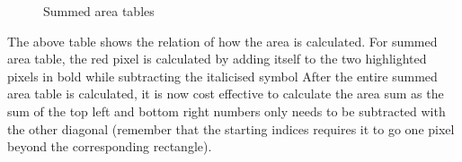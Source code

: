 \documentclass[twoside,a4paper,article]{combine}
\begin{document}
\begin{minipage}{\textwidth}\begin{figure}[H]
    \centering
    \caption{Summed area tables\cite{Szeliski_2022}}
    \label{fig:graph}
\end{figure}\end{minipage}
The above table shows the relation of how the area is calculated. For summed area table, the red pixel is calculated by adding itself to the
two highlighted pixels in bold while subtracting the italicised symbol After the entire summed area table is calculated, it is now
cost effective to calculate the area sum as the sum of the top left and bottom right numbers only needs to be subtracted with the other diagonal (remember that
the starting indices requires it to go one pixel beyond the corresponding rectangle).
\end{document}

